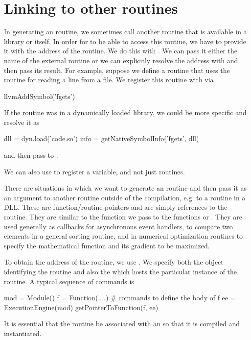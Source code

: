 \documentclass[article]{jss}
\begin{document}



\section{Linking to other routines}
In generating an \llvm{} routine, we sometimes call another routine
that is available in a library or \R{} itself. In order for \llvm{} to
be able to access this routine, we have to provide it with the address
of the routine.  We do this with .  We can pass
it either the name of the external routine or we can explicitly
resolve the address with  and then pass its
result.
For example, suppose we define a routine that uses the 
\C{} routine  for reading a line from a file.
We register this routine with \llvm{} via
\begin{RCode}
llvmAddSymbol('fgets')
\end{RCode}
If the routine was in a dynamically loaded library, we could be
more specific and resolve it as
\begin{RCode}
dll = dyn.load('code.so')
info = getNativeSymbolInfo('fgets', dll)
\end{RCode}
and then pass  to .

We can also use  to register a variable, and not
just routines.



There are situations in which we want to generate an \llvm{} routine
and then pass it as an argument to another routine outside of the
\llvm{} compilation, e.g. to a routine in a DLL.  These are
function/routine pointers and are simply references to the routine.
They are similar to the function we pass to the \R{} functions
 or .  They are used generally as callbacks
for asynchronous event handlers, to compare two elements in a general
sorting routine, and in numerical optimization routines to specify the
mathematical function and its gradient to be maximized.

To obtain the address of the \llvm{} routine, we use
.  We specify both the 
object identifying the \llvm{} routine and also the
 which hosts the particular instance of the
routine. 
A typical sequence of commands is 
\begin{RCode}
mod = Module()
f = Function(....)
# commands to define the body of f
ee = ExecutionEngine(mod)
getPointerToFunction(f, ee)
\end{RCode}
It is essential that the routine be associated with an
 so that it is compiled and instantiated.
\end{document}
